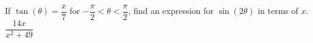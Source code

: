 {If $\tan(\theta) = \dfrac{x}{7}$ for $-\dfrac{\pi}{2} < \theta < \dfrac{\pi}{2}$, find an expression for $\sin(2\theta)$ in terms of $x$.}
{$\dfrac{14x}{x^{2} + 49}$}